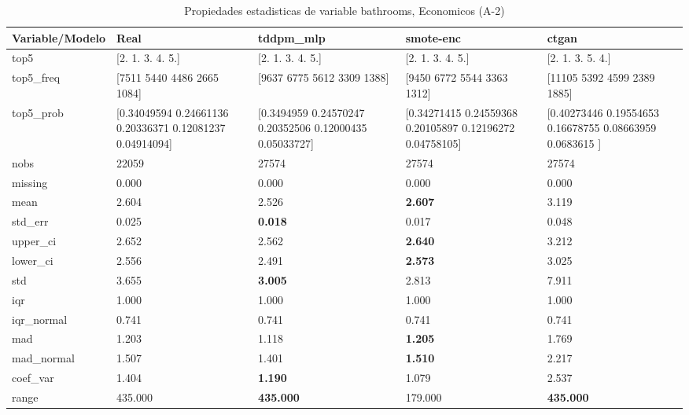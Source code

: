 \begin{table}[H]
\centering
\fontsize{8}{14}\selectfont
\caption{Propiedades  estadisticas de variable bathrooms, Economicos (A-2)}
\label{table-stats-economicos-a-2-bathrooms}
\begin{tabular}{|l|m{10em}|m{10em}|m{10em}|m{10em}|}
\hline
 \rowcolor[gray]{0.8}
Variable/Modelo & Real & tddpm\_mlp & smote-enc & ctgan \\
\hline top5 & [2. 1. 3. 4. 5.] & [2. 1. 3. 4. 5.] & [2. 1. 3. 4. 5.] & [2. 1. 3. 5. 4.] \\
\hline top5\_freq & [7511 5440 4486 2665 1084] & [9637 6775 5612 3309 1388] & [9450 6772 5544 3363 1312] & [11105  5392  4599  2389  1885] \\
\hline top5\_prob & [0.34049594 0.24661136 0.20336371 0.12081237 0.04914094] & [0.3494959  0.24570247 0.20352506 0.12000435 0.05033727] & [0.34271415 0.24559368 0.20105897 0.12196272 0.04758105] & [0.40273446 0.19554653 0.16678755 0.08663959 0.0683615 ] \\
\hline nobs & 22059 & 27574 & 27574 & 27574 \\
\hline missing & 0.000 & 0.000 & 0.000 & 0.000 \\
\hline mean & 2.604 & 2.526 & \bfseries 2.607 & \cellcolor[rgb]{0.9, 0.54, 0.52} 3.119 \\
\hline std\_err & 0.025 & \bfseries 0.018 & 0.017 & \cellcolor[rgb]{0.9, 0.54, 0.52} 0.048 \\
\hline upper\_ci & 2.652 & 2.562 & \bfseries 2.640 & \cellcolor[rgb]{0.9, 0.54, 0.52} 3.212 \\
\hline lower\_ci & 2.556 & 2.491 & \bfseries 2.573 & \cellcolor[rgb]{0.9, 0.54, 0.52} 3.025 \\
\hline std & 3.655 & \bfseries 3.005 & 2.813 & \cellcolor[rgb]{0.9, 0.54, 0.52} 7.911 \\
\hline iqr & 1.000 & 1.000 & 1.000 & 1.000 \\
\hline iqr\_normal & 0.741 & 0.741 & 0.741 & 0.741 \\
\hline mad & 1.203 & 1.118 & \bfseries 1.205 & \cellcolor[rgb]{0.9, 0.54, 0.52} 1.769 \\
\hline mad\_normal & 1.507 & 1.401 & \bfseries 1.510 & \cellcolor[rgb]{0.9, 0.54, 0.52} 2.217 \\
\hline coef\_var & 1.404 & \bfseries 1.190 & 1.079 & \cellcolor[rgb]{0.9, 0.54, 0.52} 2.537 \\
\hline range & 435.000 & \bfseries 435.000 & \cellcolor[rgb]{0.9, 0.54, 0.52} 179.000 & \bfseries 435.000 \\

\end{tabular}
\end{table}
